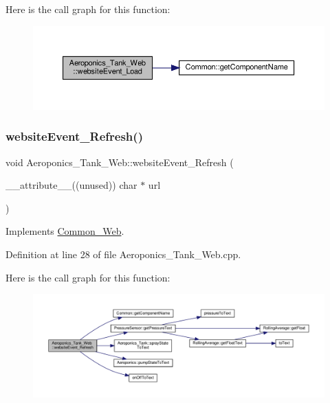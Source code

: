 Here is the call graph for this function\+:
\nopagebreak
\begin{figure}[H]
\begin{center}
\leavevmode
\includegraphics[width=350pt]{class_aeroponics___tank___web_a49ab14d7f9bffac4f4d9adf151589f15_cgraph}
\end{center}
\end{figure}
\mbox{\label{class_aeroponics___tank___web_acf883f3ff9b052706ea0548bdf8c04aa}} 
\subsubsection{\texorpdfstring{website\+Event\+\_\+\+Refresh()}{websiteEvent\_Refresh()}}
{\footnotesize\ttfamily void Aeroponics\+\_\+\+Tank\+\_\+\+Web\+::website\+Event\+\_\+\+Refresh (\begin{DoxyParamCaption}\item[{\+\_\+\+\_\+attribute\+\_\+\+\_\+((unused)) char $\ast$}]{url }\end{DoxyParamCaption})\hspace{0.3cm}{\ttfamily [virtual]}}



Implements \hyperlink{class_common___web_aaca7c54fdcf908e4e1256b7b1f6fc212}{Common\+\_\+\+Web}.



Definition at line 28 of file Aeroponics\+\_\+\+Tank\+\_\+\+Web.\+cpp.

Here is the call graph for this function\+:
\nopagebreak
\begin{figure}[H]
\begin{center}
\leavevmode
\includegraphics[width=350pt]{class_aeroponics___tank___web_acf883f3ff9b052706ea0548bdf8c04aa_cgraph}
\end{center}
\end{figure}


